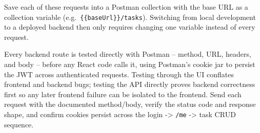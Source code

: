 \begin{tipbox}[TIP]
Save each of these requests into a Postman collection with the base URL as
a collection variable (e.g.\ \texttt{\{\{baseUrl\}\}/tasks}). Switching from
local development to a deployed backend then only requires changing one
variable instead of every request.
\end{tipbox}

\whatwhyhow
{Every backend route is tested directly with Postman -- method, URL, headers, and body -- before any React code calls it, using Postman's cookie jar to persist the JWT across authenticated requests.}
{Testing through the UI conflates frontend and backend bugs; testing the API directly proves backend correctness first so any later frontend failure can be isolated to the frontend.}
{Send each request with the documented method/body, verify the status code and response shape, and confirm cookies persist across the login -> \texttt{/me} -> task CRUD sequence.}
